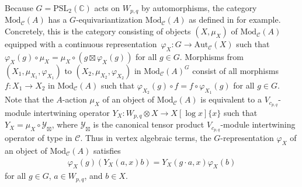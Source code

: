 \documentclass[pdftex]{sigma}
\numberwithin{equation}{section}
\theoremstyle{definition}
\begin{document}
Because $G=\mathrm{PSL}_2(\mathbb{C})$ acts on $W_{p,q}$ by automorphisms, the category $\mathrm{Mod}_\mathcal{C}(A)$ has a $G$-equivariantization $\mathrm{Mod}_\mathcal{C}(A)$ as defined in \cite[Section 2.7]{EGNO} for example. Concretely, this is the category consisting of objects $(X,\mu_X)$ of $\mathrm{Mod}_\mathcal{C}(A)$ equipped with a continuous representation~${\varphi_X\colon G\rightarrow\mathrm{Aut}_\mathcal{C}(X)}$ such that
$%
\varphi_X(g)\circ\mu_X=\mu_X\circ(g\boxtimes\varphi_X(g))
$
for all $g\in G$. Morphisms from $(X_1,\mu_{X_1},\varphi_{X_1})$ to $(X_2,\mu_{X_2},\varphi_{X_2})$ in $\mathrm{Mod}_\mathcal{C}(A)^G$ consist of all morphisms $f\colon X_1\rightarrow X_2$ in $\mathrm{Mod}_\mathcal{C}(A)$ such that
$
\varphi_{X_2}(g)\circ f =f\circ\varphi_{X_1}(g)
$
for all $g\in G$. Note that the $A$-action $\mu_X$ of an object of $\mathrm{Mod}_\mathcal{C}(A)$ is equivalent to a $V_{c_{p,q}}$-module intertwining operator $Y_X\colon W_{p,q}\otimes X\rightarrow X[\log x]\lbrace x\rbrace$ such that $Y_X=\mu_X\circ\mathcal{Y}_\boxtimes$, where $\mathcal{Y}_\boxtimes$ is the canonical tensor product $V_{c_{p,q}}$-module intertwining operator of type  in $\mathcal{C}$.
Thus in vertex algebraic terms, the $G$-representation $\varphi_X$ of an object of $\mathrm{Mod}_\mathcal{C}(A)$ satisfies
\begin{gather}\label{eqn:concrete-G-equiv}
\varphi_X(g)(Y_X(a,x)b) = Y_X(g\cdot a,x)\varphi_X(b)
\end{gather}
for all $g\in G$, $a\in W_{p,q}$, and $b\in X$.
\end{document}
